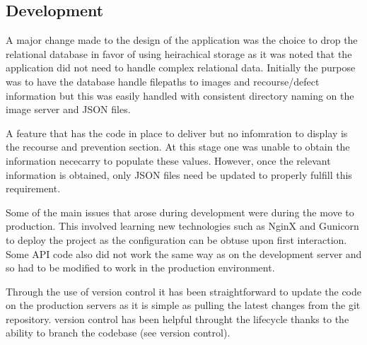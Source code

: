   \subsection{Development}
    A major change made to the design of the application was the choice to drop the relational database in favor of using heirachical storage as it was noted that the application did not need to handle complex relational data. Initially the purpose was to have the database handle filepaths to images and recourse/defect information but this was easily handled with consistent directory naming on the image server and JSON files.
    \par
    A feature that has the code in place to deliver but no infomration to display is the recourse and prevention section. At this stage one was unable to obtain the information nececarry to populate these values. However, once the relevant information is obtained, only JSON files need be updated to properly fulfill this requirement.
    \par
    Some of the main issues that arose during development were during the move to production. This involved learning new technologies such as NginX and Gunicorn to deploy the project as the configuration can be obtuse upon first interaction. Some API code also did not work the same way as on the development server and so had to be modified to work in the production environment.
    \par
    Through the use of version control it has been straightforward to update the code on the production servers as it is simple as pulling the latest changes from the git repository. version control has been helpful throught the lifecycle thanks to the ability to branch the codebase (see version control).
